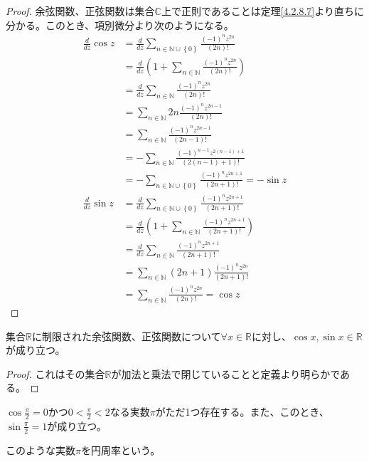 \documentclass[dvipdfmx]{jsarticle}
\begin{document}
\begin{proof}
余弦関数、正弦関数は集合$\mathbb{C}$上で正則であることは定理\ref{4.2.8.7}より直ちに分かる。このとき、項別微分より次のようになる。
\begin{align*}
\frac{d}{dz}\cos z &= \frac{d}{dz}\sum_{n \in \mathbb{N} \cup \left\{ 0 \right\}} \frac{( - 1)^{n}z^{2n}}{(2n)!}\\
&= \frac{d}{dz}\left( 1 + \sum_{n \in \mathbb{N}} \frac{( - 1)^{n}z^{2n}}{(2n)!} \right)\\
&= \frac{d}{dz}\sum_{n \in \mathbb{N}} \frac{( - 1)^{n}z^{2n}}{(2n)!}\\
&= \sum_{n \in \mathbb{N}} {2n\frac{( - 1)^{n}z^{2n - 1}}{(2n)!}}\\
&= \sum_{n \in \mathbb{N}} \frac{( - 1)^{n}z^{2n - 1}}{(2n - 1)!}\\
&= - \sum_{n \in \mathbb{N}} \frac{( - 1)^{n - 1}z^{2(n - 1) + 1}}{\left( 2(n - 1) + 1 \right)!}\\
&= - \sum_{n \in \mathbb{N} \cup \left\{ 0 \right\}} \frac{( - 1)^{n}z^{2n + 1}}{(2n + 1)!} = - \sin z\\
\frac{d}{dz}\sin z &= \frac{d}{dz}\sum_{n \in \mathbb{N} \cup \left\{ 0 \right\}} \frac{( - 1)^{n}z^{2n + 1}}{(2n + 1)!}\\
&= \frac{d}{dz}\left( 1 + \sum_{n \in \mathbb{N}} \frac{( - 1)^{n}z^{2n + 1}}{(2n + 1)!} \right)\\
&= \frac{d}{dz}\sum_{n \in \mathbb{N}} \frac{( - 1)^{n}z^{2n + 1}}{(2n + 1)!}\\
&= \sum_{n \in \mathbb{N}} {(2n + 1)\frac{( - 1)^{n}z^{2n}}{(2n + 1)!}}\\
&= \sum_{n \in \mathbb{N}} \frac{( - 1)^{n}z^{2n}}{(2n)!} = \cos z
\end{align*}
\end{proof}
\begin{thm}\label{4.3.1.18}
集合$\mathbb{R}$に制限された余弦関数、正弦関数について$\forall x \in \mathbb{R}$に対し、$\cos x,\sin x \in \mathbb{R}$が成り立つ。
\end{thm}
\begin{proof}
これはその集合$\mathbb{R}$が加法と乗法で閉じていることと定義より明らかである。
\end{proof}
\begin{thm}\label{4.3.1.19}
$\cos\frac{\pi}{2} = 0$かつ$0 < \frac{\pi}{2} < 2$なる実数$\pi$がただ1つ存在する。また、このとき、$\sin\frac{\pi}{2} = 1$が成り立つ。
\end{thm}
\begin{dfn} このような実数$\pi$を円周率という。
\end{dfn}
\end{document}
